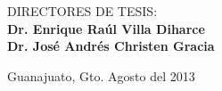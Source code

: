 \documentclass[letterpaper, titlepage,openright, oneside,11pt]{book}
\begin{document}
\begin{minipage}[c][11cm][s]{13.4cm}
\begin{center}
{     \vspace{13mm}      {DIRECTORES DE TESIS:} \\

     \vspace{5mm}     {\textbf{Dr. Enrique Ra\'ul Villa Diharce} }\\
     
       \vspace{5mm}     {\textbf{ Dr. Jos\'e Andr\'es Christen Gracia} }\\

     \vspace{13mm}

      }


     \LARGE{Guanajuato, Gto.                                Agosto del 2013}

    \end{center}

\end{minipage}

\newpage
\end{document}
